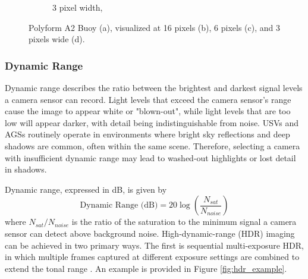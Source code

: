 \documentclass{erauthesis}
\begin{document}
\begin{figure}[htbp]
\begin{subfigure}[t]{0.245\textwidth}
    \caption{
    3 pixel width,\\  
    }
    \label{fig:A2_3px}
\end{subfigure}
\caption{Polyform A2 Buoy (a), visualized at 16 pixels (b), 6 pixels (c), and 3 pixels wide (d).}
\label{fig:A2_multi_res}
\end{figure}




\subsubsection{Dynamic Range}
Dynamic range describes the ratio between the brightest and darkest signal levels a camera sensor can record.
Light levels that exceed the camera sensor's range cause the image to appear white or "blown-out", while light levels that are too low will appear darker, with detail being indistinguishable from noise.
\acp{USV} and \acp{AGS} routinely operate in environments where bright sky reflections and deep shadows are common, often within the same scene.
Therefore, selecting a camera with insufficient dynamic range may lead to washed-out highlights or lost detail in shadows.

Dynamic range, expressed in dB, is given by
\begin{equation}
 \text{Dynamic Range (dB)} = 20 \log{\left( \frac{N_{sat}}{N_{noise}}\right) }
\end{equation}
where $N_{sat}/N_{noise}$ is the ratio of the saturation to the minimum signal a camera sensor can detect above background noise.
High-dynamic-range (HDR) imaging can be achieved in two primary ways. 
The first is sequential multi-exposure \ac{HDR}, in which multiple frames captured at different exposure settings are combined to extend the tonal range \cite{Reinhard2010}. An example is provided in Figure \ref{fig:hdr_example}.
\end{document}
